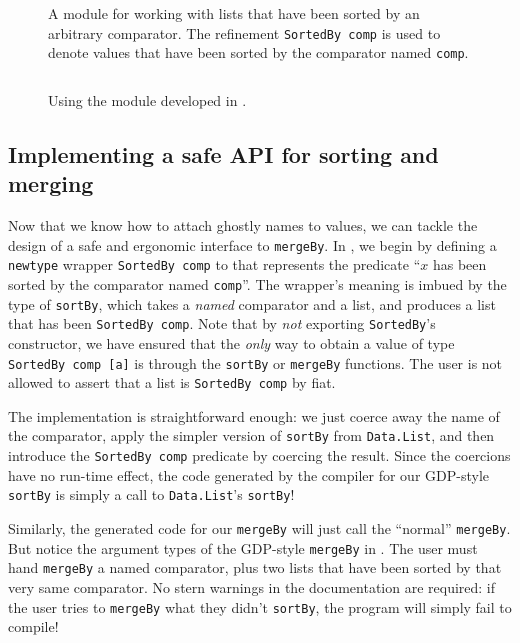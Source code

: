 \documentclass[format=sigplan, review=false, screen=true]{acmart}
\begin{document}
\begin{figure}
  \inputminted{haskell}{ordered.hs}
  \caption{A module for working with lists that have been sorted by an arbitrary
    comparator. The refinement \texttt{SortedBy comp} is used to denote values that
    have been sorted by the comparator named \texttt{comp}.\label{sorted-module}}
\end{figure}


\begin{figure}
  \inputminted{haskell}{usageO.hs}
  \caption{Using the module developed in .\label{sorted-module-demo}}
  \end{figure}

\subsection{Implementing a safe API for sorting and merging}
Now that we know how to attach ghostly names to values, we can tackle the design of a
safe and ergonomic interface to \texttt{mergeBy}. In , we begin by defining
a \texttt{newtype} wrapper \texttt{SortedBy comp} to that represents the predicate
``$x$ has been sorted by the comparator named \texttt{comp}''. The
wrapper's meaning is imbued by the type of \texttt{sortBy}, which takes a \emph{named}
comparator and a list, and produces a list that has been \texttt{SortedBy comp}.
Note that by \emph{not} exporting \texttt{SortedBy}'s constructor, we have ensured that
the \emph{only} way to obtain a value of type \texttt{SortedBy comp [a]} is through the
\texttt{sortBy} or \texttt{mergeBy} functions. The user is not allowed to assert that a
list is \texttt{SortedBy comp} by fiat.

The implementation is straightforward enough: we just coerce away the name of the comparator,
apply the simpler version of \texttt{sortBy} from \texttt{Data.List}, and then
introduce the \texttt{SortedBy comp} predicate by coercing the result. Since the coercions have
no run-time effect, the code generated by the compiler for our GDP-style \texttt{sortBy} is
simply a call to \texttt{Data.List}'s \texttt{sortBy}!

Similarly, the generated code for our \texttt{mergeBy} will just call the ``normal'' \texttt{mergeBy}.
But notice the argument types of the GDP-style \texttt{mergeBy} in . The user
must hand \texttt{mergeBy} a named comparator, plus two lists that have been sorted by that very same
comparator. No stern warnings in the documentation are required: if the user tries to \texttt{mergeBy}
what they didn't \texttt{sortBy}, the program will simply fail to compile!
\end{document}
